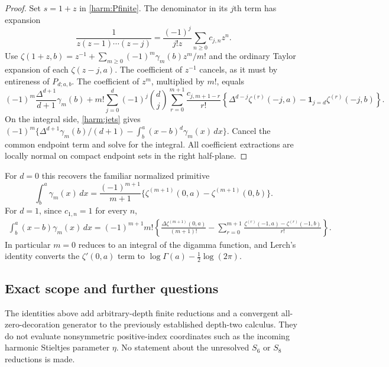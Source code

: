 \documentclass[11pt,a4paper]{article}
\numberwithin{equation}{section}
\theoremstyle{definition}
\theoremstyle{remark}
\begin{document}
\begin{proof}
Set $s=1+z$ in \eqref{harm:Pfinite}. The denominator in its $j$th
term has expansion
\[
 \frac1{z(z-1)\cdots(z-j)}
       =\frac{(-1)^j}{j!z}\sum_{n\ge0}c_{j,n}z^n.
\]
Use
$\zeta(1+z,b)=z^{-1}+\sum_{m\ge0}(-1)^m\gamma_m(b)z^m/m!$
and the ordinary Taylor expansion of each $\zeta(z-j,a)$.
The coefficient of $z^{-1}$ cancels, as it must by entireness of
$P_{d;a,b}$. The coefficient of $z^m$, multiplied by $m!$, equals
\[
 (-1)^m\frac{\Delta^{d+1}}{d+1}\gamma_m(b)
 +m!\sum_{j=0}^d(-1)^j\binom dj
    \sum_{r=0}^{m+1}\frac{c_{j,m+1-r}}{r!}
       \left\{\Delta^{d-j}\zeta^{(r)}(-j,a)
                         -\mathbf1_{j=d}\zeta^{(r)}(-j,b)\right\}.
\]
On the integral side, \eqref{harm:jets} gives
$(-1)^m\{\Delta^{d+1}\gamma_m(b)/(d+1)
 -\int_b^a(x-b)^d\gamma_m(x)\,dx\}$.
Cancel the common endpoint term and solve for the integral.
All coefficient extractions are locally normal on compact endpoint
sets in the right half-plane.
\end{proof}

For $d=0$ this recovers the familiar normalized primitive
\begin{equation}
 \int_b^a\gamma_m(x)\,dx
       =\frac{(-1)^{m+1}}{m+1}
          \{\zeta^{(m+1)}(0,a)-\zeta^{(m+1)}(0,b)\}.
 \label{harm:d0}
\end{equation}
For $d=1$, since $c_{1,n}=1$ for every $n$,
\begin{align}
 \int_b^a(x-b)\gamma_m(x)\,dx
  =(-1)^{m+1}m!\left\{
       \frac{\Delta\zeta^{(m+1)}(0,a)}{(m+1)!}
       -\sum_{r=0}^{m+1}
          \frac{\zeta^{(r)}(-1,a)-\zeta^{(r)}(-1,b)}{r!}
                         \right\}.
 \label{harm:d1}
\end{align}
In particular $m=0$ reduces to an integral of the digamma function,
and Lerch's identity converts the $\zeta'(0,a)$ term to
$\log\Gamma(a)-\tfrac12\log(2\pi)$.

\subsection{Exact scope and further questions}

The identities above add arbitrary-depth finite reductions and a
convergent all-zero-decoration generator to the previously established
depth-two calculus. They do not evaluate nonsymmetric positive-index
coordinates such as the incoming harmonic Stieltjes parameter $\eta$.
No statement about the unresolved $S_6$ or $S_8$ reductions is made.
\end{document}
